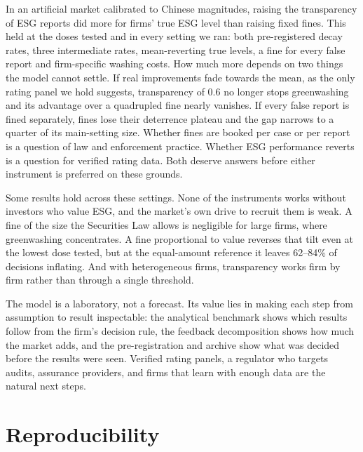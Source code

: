 \documentclass[11pt]{article}
\begin{document}
In an artificial market calibrated to Chinese magnitudes, raising the transparency of ESG reports did more for firms' true ESG level than raising fixed fines. This held at the doses tested and in every setting we ran: both pre-registered decay rates, three intermediate rates, mean-reverting true levels, a fine for every false report and firm-specific washing costs. How much more depends on two things the model cannot settle. If real improvements fade towards the mean, as the only rating panel we hold suggests, transparency of 0.6 no longer stops greenwashing and its advantage over a quadrupled fine nearly vanishes. If every false report is fined separately, fines lose their deterrence plateau and the gap narrows to a quarter of its main-setting size. Whether fines are booked per case or per report is a question of law and enforcement practice. Whether ESG performance reverts is a question for verified rating data. Both deserve answers before either instrument is preferred on these grounds.

Some results hold across these settings. None of the instruments works without investors who value ESG, and the market's own drive to recruit them is weak. A fine of the size the Securities Law allows is negligible for large firms, where greenwashing concentrates. A fine proportional to value reverses that tilt even at the lowest dose tested, but at the equal-amount reference it leaves 62--84\% of decisions inflating. And with heterogeneous firms, transparency works firm by firm rather than through a single threshold.

The model is a laboratory, not a forecast. Its value lies in making each step from assumption to result inspectable: the analytical benchmark shows which results follow from the firm's decision rule, the feedback decomposition shows how much the market adds, and the pre-registration and archive show what was decided before the results were seen. Verified rating panels, a regulator who targets audits, assurance providers, and firms that learn with enough data are the natural next steps.




\appendix

\section{Reproducibility}\label{app:repro}
\end{document}
